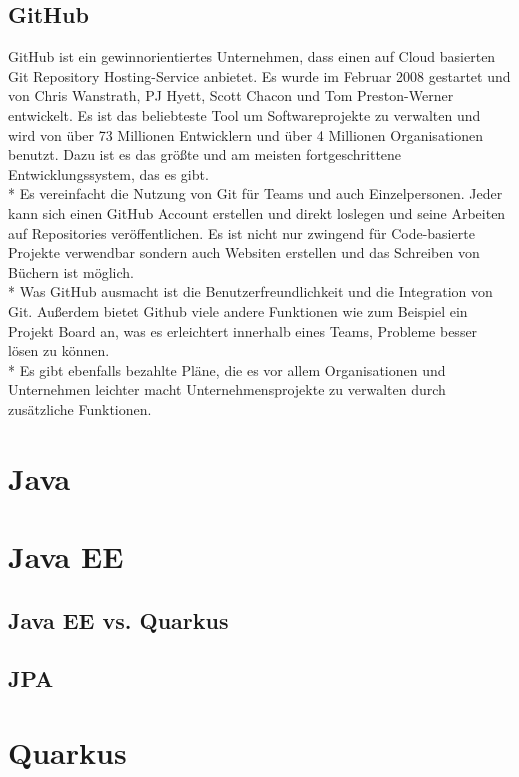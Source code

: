 \subsection{GitHub}
GitHub ist ein gewinnorientiertes Unternehmen, dass einen auf Cloud basierten Git Repository Hosting-Service anbietet.
Es wurde im Februar 2008 gestartet und von Chris Wanstrath, PJ Hyett, Scott Chacon und Tom Preston-Werner entwickelt.
Es ist das beliebteste Tool um Softwareprojekte zu verwalten und wird von über 73 Millionen Entwicklern und über 4 Millionen Organisationen
benutzt. Dazu ist es das größte und am meisten fortgeschrittene Entwicklungssystem, das es gibt. \cite{GitHub} \\*
Es vereinfacht die Nutzung von Git für Teams und auch Einzelpersonen. 
Jeder kann sich einen GitHub Account erstellen und direkt loslegen und seine Arbeiten auf Repositories veröffentlichen.
Es ist nicht nur zwingend für Code-basierte Projekte verwendbar sondern auch Websiten erstellen und das Schreiben von Büchern ist möglich.
\\*
Was GitHub ausmacht ist die Benutzerfreundlichkeit und die Integration von Git. Außerdem bietet Github viele andere Funktionen wie zum Beispiel ein Projekt Board an,
was es erleichtert innerhalb eines Teams, Probleme besser lösen zu können. \\*
Es gibt ebenfalls bezahlte Pläne, die es vor allem Organisationen und Unternehmen leichter macht Unternehmensprojekte zu verwalten durch zusätzliche Funktionen.
\cite{GitKinsta}



\section{Java}

\section{Java EE}
\subsection{Java EE vs. Quarkus}

\subsection{JPA}

\section{Quarkus}
